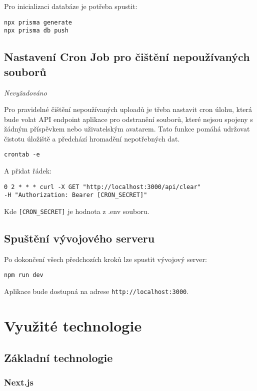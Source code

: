 \documentclass[12pt]{article}
\begin{document}
Pro inicializaci databáze je potřeba spustit:

\begin{verbatim}
npx prisma generate
npx prisma db push
\end{verbatim}

\subsection{Nastavení Cron Job pro čištění nepoužívaných souborů} \small{\textit{Nevyžadováno}}

Pro pravidelné čištění nepoužívaných uploadů je třeba nastavit cron úlohu, která bude volat API endpoint aplikace pro odstranění souborů, které nejsou spojeny s žádným příspěvkem nebo uživatelským avatarem. Tato funkce pomáhá udržovat čistotu úložiště a předchází hromadění nepotřebných dat.

\begin{verbatim}
crontab -e
\end{verbatim}

A přidat řádek:

\begin{verbatim}
0 2 * * * curl -X GET "http://localhost:3000/api/clear" 
-H "Authorization: Bearer [CRON_SECRET]"
\end{verbatim}

Kde \texttt{[CRON\_SECRET]} je hodnota z .env souboru.

\subsection{Spuštění vývojového serveru}

Po dokončení všech předchozích kroků lze spustit vývojový server:

\begin{verbatim}
npm run dev
\end{verbatim}

Aplikace bude dostupná na adrese \texttt{http://localhost:3000}.

\newpage
\section{Využité technologie}

\subsection{Základní technologie}

\subsubsection{Next.js}
\end{document}
